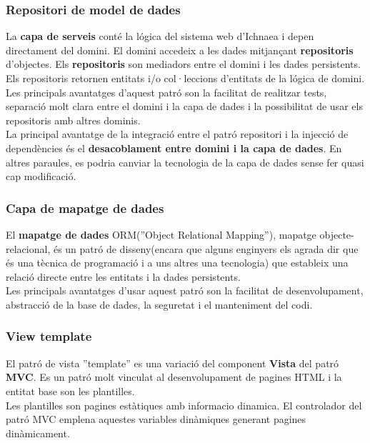 \subsubsection{Repositori de model de dades}
La \textbf{capa de serveis} cont\'{e} la l\'{o}gica del sistema web d'Ichnaea i depen directament del domini. El domini accedeix a les dades mitjançant \textbf{repositoris} d'objectes. Els \textbf{repositoris} son mediadors entre el domini i les dades persistents. Els repositoris retornen entitats i/o col·leccions d'entitats de la l\'{ogica} de domini.\\

Les principals avantatges d'aquest patró son la facilitat de realitzar tests, separació molt clara entre el domini i la capa de dades i la possibilitat de usar els repositoris amb altres dominis.\\

La principal avantatge de la integració entre el patró repositori i la injecció de dependències \'{e}s el \textbf{desacoblament entre domini i la capa de dades}. En altres paraules, es podria canviar la tecnologia de la capa de dades sense fer quasi cap modificació. 

\label{ormdessign}
\subsubsection{Capa de mapatge de dades}
El \textbf{mapatge de dades} ORM(''Object Relational Mapping''), mapatge objecte-relacional, \'{e}s un patr\'{o} de disseny(encara que alguns enginyers els agrada dir que \'{e}s una tècnica de programaci\'{o} i a uns altres una tecnologia) que estableix una relaci\'{o} directe entre les entitats i la dades persistents.\cite{orm}\\

Les principals avantatges d'usar aquest patró son la facilitat de desenvolupament, abstracció de la base de dades, la seguretat i el manteniment del codi.

\subsubsection{View template}
El patró de vista ''template'' es una variació del component \textbf{Vista} del patró \textbf{MVC}. Es un patró molt vinculat al desenvolupament de pagines HTML i la entitat base son les plantilles.\\

Les plantilles son pagines estàtiques amb informacio dinamica. El controlador del patró MVC emplena aquestes variables dinàmiques generant pagines dinàmicament.\cite{viewtemplate}\\

